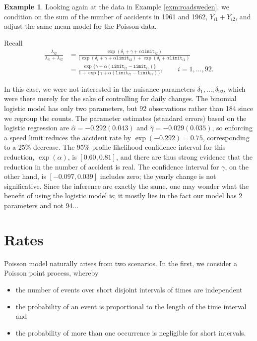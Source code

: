 \documentclass[
  11pt,
  letterpaper,
]{book}
\providecommand{\tightlist}{%
  \setlength{\itemsep}{0pt}\setlength{\parskip}{0pt}}
\theoremstyle{definition}
\theoremstyle{definition}
\newtheorem{example}{Example}[chapter]
\theoremstyle{definition}
\theoremstyle{definition}
\theoremstyle{remark}
\begin{document}
\begin{example}
\protect\hypertarget{exm:swedenex2}{}\label{exm:swedenex2}Looking again at the data in Example \ref{exm:roadsweden}, we condition on the sum of the number of accidents in 1961 and 1962, \(Y_{i1} + Y_{i2}\), and adjust the same mean model for the Poisson data.
\end{example}

Recall
\begin{align*}
\frac{\lambda_{i2}}{
\lambda_{i1} + \lambda_{i2}} &= \frac{\exp(\delta_i + \gamma + \alpha \texttt{limit}_{i2})}{(\exp(\delta_i + \gamma + \alpha \texttt{limit}_{i2}) + \exp(\delta_i + \alpha \texttt{limit}_{i1})} \\&= \frac{\exp\{\gamma + \alpha(\texttt{limit}_{i2}-\texttt{limit}_{i1})\}}{1+{\exp\{\gamma + \alpha(\texttt{limit}_{i2}-\texttt{limit}_{i1})\}}}, \qquad i=1, \ldots, 92. 
\end{align*}

In this case, we were not interested in the nuisance parameters \(\delta_1, \ldots, \delta_{92}\), which were there merely for the sake of controlling for daily changes. The binomial logistic model has only two parameters, but 92 observations rather than 184 since we regroup the counts.
The parameter estimates (standard errors) based on the logistic regression are \(\widehat{\alpha} = -0.292 (0.043)\) and \(\widehat{\gamma}=-0.029(0.035)\), so enforcing a speed limit reduces the accident rate by \(\exp(-0.292)=0.75\), corresponding to a 25\% decrease. The 95\% profile likelihood confidence interval for this reduction, \(\exp(\alpha)\), is \([0.60, 0.81]\), and there are thus strong evidence that the reduction in the number of accident is real. The confidence interval for \(\gamma\), on the other hand, is \([-0.097, 0.039]\) includes zero; the yearly change is not significative. Since the inference are exactly the same, one may wonder what the benefit of using the logistic model is; it mostly lies in the fact our model has 2 parameters and not 94\(\ldots\)

\hypertarget{rates}{%
\section{Rates}\label{rates}}

Poisson model naturally arises from two scenarios. In the first, we consider a Poisson point process, whereby

\begin{itemize}
\tightlist
\item
  the number of events over short disjoint intervals of times are independent
\item
  the probability of an event is proportional to the length of the time interval and
\item
  the probability of more than one occurrence is negligible for short intervals.
\end{itemize}
\end{document}
